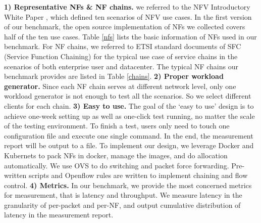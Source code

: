 
\textbf{1) Representative NFs \& NF chains.}
we referred to the NFV Introductory White Paper \cite{},
which defined ten scenarios of NFV use cases.
In the first version of our benchmark,
the open source implementation of NFs we collected
covers half of the ten use cases.
Table \ref{nfs} lists the basic information of NFs used in our benchmark.
For NF chains, we referred to ETSI standard documents of SFC
(Service Function Chaining) \cite{draft-ietf-sfc-dc-use-cases-06}
for the typical use case of service chains
in the scenarios of both enterprise user and datacenter.
The typical NF chains our benchmark provides are listed in Table \ref{chains}.
\textbf{2) Proper workload generator.}
Since each NF chain serves at different network level,
only one workload generator is not enough to test all the scenarios.
So we select different clients for each chain.
\textbf{3) Easy to use.}
The goal of the `easy to use' design is to
achieve one-week setting up as well as one-click test running,
no matter the scale of the testing environment.
To finish a test, users only need to touch one configuration file
and execute one single command.
In the end, the measurement report will be output to a file.
To implement our design,
we leverage Docker and Kubernets to pack NFs in docker,
manage the images, and do allocation automatically.
We use OVS to do switching and packet force forwarding.
Pre-written scripts and Openflow rules are written
to implement chaining and flow control.
\textbf{4) Metrics.}
In our benchmark, we provide the most concerned metrics for measurement,
that is latency and throughput.
We measure latency in the granularity of per-packet and per-NF,
and output cumulative distribution of latency in the measurement report.

